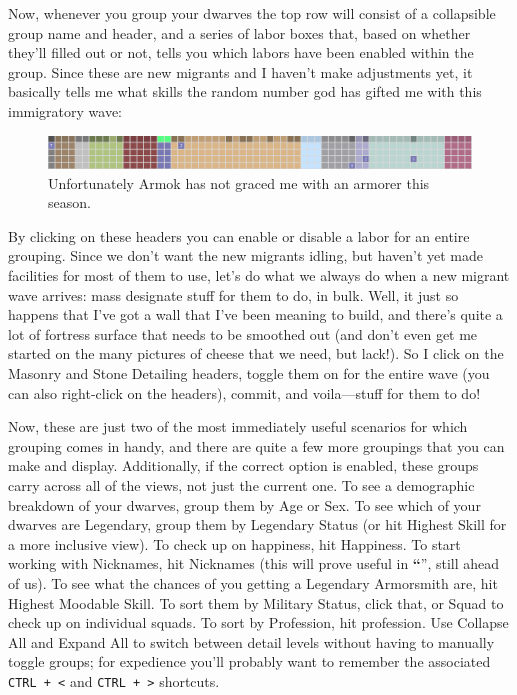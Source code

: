\documentclass[]{article}
\newcommand{\jump}[1] {\textbf{``\nameref{sec:#1}}''}
\begin{document}
Now, whenever you group your dwarves the top row will consist of a collapsible group name and header, and
a series of labor boxes that, based on whether they'll filled out or not, tells you which labors have
been enabled within the group. Since these are new migrants and I haven't make adjustments yet, it
basically tells me what skills the random number god has gifted me with this immigratory wave:

\begin{figure}[h!]
\centering
\includegraphics[width=\linewidth]{Sec2Fig9}
\caption{Unfortunately Armok has not graced me with an armorer this season.}
\end{figure}

By clicking on these headers you can enable or disable a labor for an entire grouping. Since we don't
want the new migrants idling, but haven't yet made facilities for most of them to use, let's do what we
always do when a new migrant wave arrives: mass designate stuff for them to do, in bulk. Well, it just so
happens that I've got a wall that I've been meaning to build, and there's quite a lot of fortress surface
that needs to be smoothed out (and don't even get me started on the many pictures of cheese that we need,
but lack!). So I click on the Masonry and Stone Detailing headers, toggle them on for the entire wave
(you can also right-click on the headers), commit, and voila---stuff for them to do!

Now, these are just two of the most immediately useful scenarios for which grouping comes in handy, and
there are quite a few more groupings that you can make and display. Additionally, if the correct option
is enabled, these groups carry across all of the views, not just the current one. To see a
demographic breakdown of your dwarves, group them by Age or Sex. To see which of your dwarves are
Legendary, group them by Legendary Status (or hit Highest Skill for a more inclusive view). To check up
on happiness, hit Happiness. To start working with Nicknames, hit Nicknames (this will prove useful in
\jump{Assigning Nicknames}, still ahead of us). To see what the chances of you
getting a Legendary Armorsmith are, hit Highest Moodable Skill. To sort them by Military Status, click
that, or Squad to check up on individual squads. To sort by Profession, hit profession.
Use Collapse All and Expand All to switch between detail levels without having to manually toggle groups;
for expedience you'll probably want to remember the associated \texttt{CTRL + <} and \texttt{CTRL + >}
shortcuts.
\end{document}
